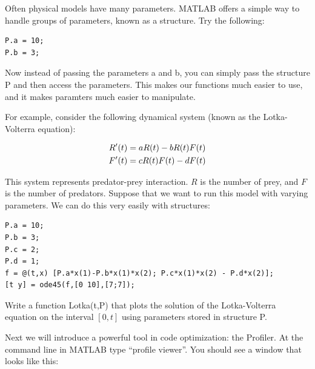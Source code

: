 

Often physical models have many parameters. MATLAB offers a simple way to handle groups of parameters, known as a structure. Try the following:

\begin{lstlisting}[style=matlab]
P.a = 10;
P.b = 3;
\end{lstlisting}

Now instead of passing the parameters a and b, you can simply pass the structure P and then access the parameters. This makes our functions much easier to use, and it makes paramters much easier to manipulate.

For example, consider the following dynamical system (known as the Lotka-Volterra equation):

\begin{equation}
    \begin{split}
        R'(t) &=aR(t)-bR(t)F(t)\\
        F'(t) &=cR(t)F(t)-dF(t)
    \end{split}\notag
\end{equation}

This system represents predator-prey interaction. $R$ is the number of prey, and $F$ is the number of predators. Suppose that we want to run this model with varying parameters. We can do this very easily with structures:

\begin{lstlisting}[style=matlab]
P.a = 10;
P.b = 3;
P.c = 2;
P.d = 1;
f = @(t,x) [P.a*x(1)-P.b*x(1)*x(2); P.c*x(1)*x(2) - P.d*x(2)];
[t y] = ode45(f,[0 10],[7;7]);
\end{lstlisting}

\begin{problem}
Write a function Lotka(t,P) that plots the solution of the Lotka-Volterra equation on the interval $[0,t]$ using parameters stored in structure P. 
\end{problem}

Next we will introduce a powerful tool in code optimization: the Profiler. At the command line in MATLAB type ``profile viewer''. You should see a window that looks like this:

